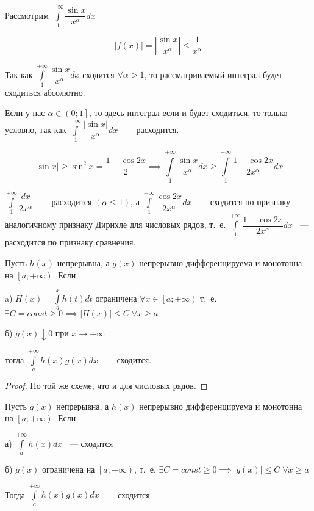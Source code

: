 \documentclass[../../main.tex]{subfiles}
\begin{document}
\begin{exmp}
 Рассмотрим $\displaystyle\int\limits_{1}^{+\infty} \dfrac{\sin{x}}{x^{\alpha}}dx$
 
 \[\left| f(x) \right| = \left| \dfrac{\sin{x}}{x^{\alpha}}\right| \leq \dfrac{1}{x^{\alpha}}\]
 
 Так как $\displaystyle\int\limits_{1}^{+\infty} \dfrac{\sin{x}}{x^{\alpha}}dx$ сходится $\forall \alpha  > 1$, то рассматриваемый интеграл будет сходиться абсолютно.
 
 Если у нас $\alpha \in \left(0; 1 \right]$, то здесь интеграл если и будет сходиться, то только условно, так как $\displaystyle\int\limits_{1}^{+\infty}\dfrac{\left| \sin{x}\right|}{x^{\alpha}}dx$ ~--- расходится.
 
 \[\left| \sin{x} \right| \geq \sin^2{x} = \dfrac{1-\cos{2x}}{2} \implies \int\limits_{1}^{+\infty} \dfrac{\sin{x}}{x^{\alpha}}dx \geq \int\limits_{1}^{+\infty} \dfrac{1 - \cos{2x}}{2x^{\alpha}}dx\]
 
 $\displaystyle\int\limits_{1}^{+\infty} \dfrac{dx}{2x^{\alpha}}$ ~--- расходится $(\alpha \leq 1)$, а $\displaystyle\int\limits_{1}^{+\infty} \dfrac{\cos{2x}}{2x^{\alpha}}dx$ ~--- сходится по признаку аналогичному признаку Дирихле для числовых рядов, т.~е. $\displaystyle\int\limits_{1}^{+\infty} \dfrac{1 - \cos{2x}}{2x^{\alpha}}dx$ ~--- расходится по признаку сравнения. 
\end{exmp}

\begin{theorem}
 Пусть $h(x)$ непрерывна, а $g(x)$ непрерывно дифференцируема и монотонна на $\left[a; +\infty\right)$.
Если

a) $H(x) = \displaystyle\int\limits_{a}^{x}h(t)dt$ ограничена $\forall x \in \left[a; +\infty \right)$ т.~е. $\exists C = const \geq 0 \implies \left| H(x) \right| \leq C \; \forall x \geq a$

б) $g(x) \downarrow 0$ при $x \to +\infty$

тогда $\displaystyle\int\limits_{a}^{+\infty}h(x)g(x)dx$ ~--- сходится.

\end{theorem}
\begin{proof}
 По той же схеме, что и для числовых рядов.
\end{proof}

\begin{thm}
Пусть $g(x)$ непрерывна, а $h(x)$ непрерывно дифференцируема и монотонна на $\left[a; +\infty \right)$. Если

а) $\displaystyle\int\limits_{a}^{+\infty}h(x)dx$ ~--- сходится

б) $g(x)$ ограничена на $\left[a; +\infty\right)$, т.~е. $\exists C = const\geq 0 \implies \left| g(x) \right| \leq C \; \forall x \geq a$

Тогда $\displaystyle\int\limits_{a}^{+\infty} h(x)g(x)dx$ ~--- сходится
\end{thm}
\end{document}
